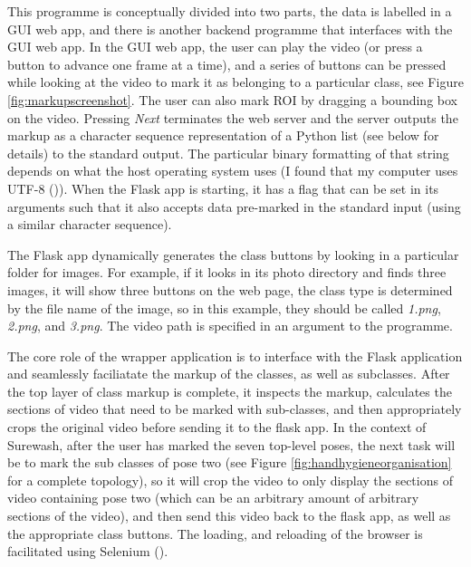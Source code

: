     This programme is conceptually divided into two parts, the data is labelled in a GUI web app, and there is another backend programme that interfaces with the GUI web app. In the GUI web app, the user can play the video (or press a button to advance one frame at a time), and a series of buttons can be pressed while looking at the video to mark it as belonging to a particular class, see Figure \ref{fig:markupscreenshot}. The user can also mark ROI by dragging a bounding box on the video. Pressing {\slshape Next} terminates the web server and the server outputs the markup as a character sequence representation of a Python list (see below for details) to the standard output. The particular binary formatting of that string depends on what the host operating system uses (I found that my computer uses UTF-8 (\cite{yergeau1996utf})). When the Flask app is starting, it has a flag that can be set in its arguments such that it also accepts data pre-marked in the standard input (using a similar character sequence).

    The Flask app dynamically generates the class buttons by looking in a particular folder for images. For example, if it looks in its photo directory and finds three images, it will show three buttons on the web page, the class type is determined by the file name of the image, so in this example, they should be called {\slshape 1.png}, {\slshape 2.png}, and {\slshape 3.png}. The video path is specified in an argument to the programme.

    The core role of the wrapper application is to interface with the Flask application and seamlessly faciliatate the markup of the classes, as well as subclasses. After the top layer of class markup is complete, it inspects the markup, calculates the sections of video that need to be marked with sub-classes, and then appropriately crops the original video before sending it to the flask app. In the context of Surewash, after the user has marked the seven top-level poses, the next task will be to mark the sub classes of pose two (see Figure \ref{fig:handhygieneorganisation} for a complete topology), so it will crop the video to only display the sections of video containing pose two (which can be an arbitrary amount of arbitrary sections of the video), and then send this video back to the flask app, as well as the appropriate class buttons. The loading, and reloading of the browser is facilitated using Selenium (\cite{selenium}).



